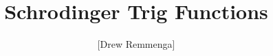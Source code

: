 \documentclass[10pt, oneside]{article}
\title{Schrodinger Trig Functions}
\author{[Drew Remmenga]}
\begin{document}
\maketitle
\begin{abstract}
\end{abstract}
\section{} 
\end{document}
